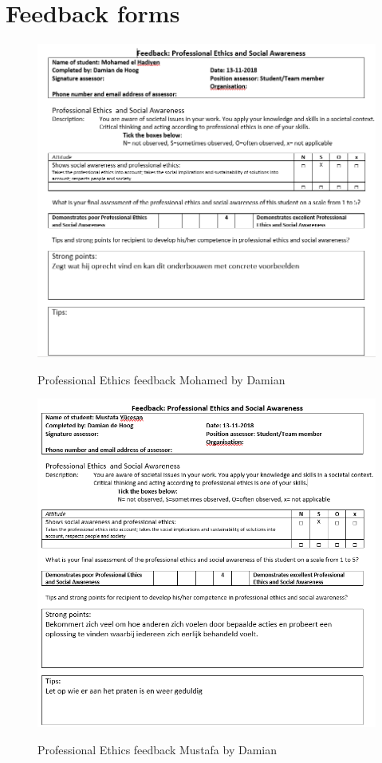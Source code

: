 \documentclass[12pt]{article}
\begin{document}
	\section{Feedback forms}
	\begin{figure}[h]
		\centering
		\includegraphics[width=\columnwidth]{ProfEthMohamed.PNG}\\
		\caption{Professional Ethics feedback Mohamed by Damian}
	\end{figure}
	\begin{figure}[p!]
		\centering
		\includegraphics[width=\columnwidth]{ProfEthMustafa.PNG}\\
		\caption{Professional Ethics feedback Mustafa by Damian}
	\end{figure}
\end{document}
